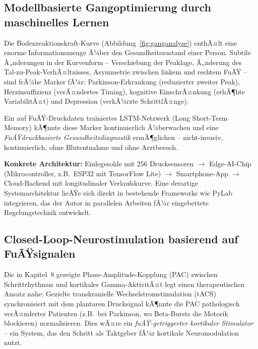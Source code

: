 ﻿\documentclass[12pt,a4paper]{report}
\theoremstyle{plain}
\theoremstyle{definition}
\theoremstyle{remark}
\begin{document}
\subsection{Modellbasierte Gangoptimierung durch maschinelles Lernen}

Die Bodenreaktionskraft-Kurve (Abbildung~\ref{fig:ganganalyse})
enthÃ¤lt eine enorme Informationsmenge Ã¼ber den Gesundheitszustand
einer Person. Subtile Ã„nderungen in der Kurvenform -- Verschiebung
der Peaklage, Ã„nderung des Tal-zu-Peak-VerhÃ¤ltnisses, Asymmetrie
zwischen linkem und rechtem FuÃŸ -- sind frÃ¼he Marker fÃ¼r:
Parkinson-Erkrankung (reduzierter zweiter Peak), Herzinsuffizienz
(verÃ¤ndertes Timing), kognitive EinschrÃ¤nkung (erhÃ¶hte VariabilitÃ¤t)
und Depression (verkÃ¼rzte SchrittlÃ¤nge).

Ein auf FuÃŸ-Druckdaten trainiertes LSTM-Netzwerk (Long Short-Term
Memory) kÃ¶nnte diese Marker kontinuierlich Ã¼berwachen und eine
\emph{FuÃŸdruckbasierte Gesundheitsdiagnostik} ermÃ¶glichen --
nicht-invasiv, kontinuierlich, ohne Blutentnahme und ohne
Arztbesuch.

\textbf{Konkrete Architektur:} Einlegesohle mit 256
Drucksensoren $\to$ Edge-AI-Chip (Mikrocontroller, z.B.\ ESP32 mit
TensorFlow Lite) $\to$ Smartphone-App $\to$ Cloud-Backend mit
longitudinaler Verlaufskurve. Eine derartige Systemarchitektur
lieÃŸe sich direkt in bestehende Frameworks wie PyLab integrieren,
das der Autor in parallelen Arbeiten fÃ¼r eingebettete
Regelungstechnik entwickelt.

\subsection{Closed-Loop-Neurostimulation basierend auf FuÃŸsignalen}

Die in Kapitel~8 gezeigte Phase-Amplitude-Kopplung (PAC) zwischen
Schrittrhythmus und kortikaler Gamma-AktivitÃ¤t legt einen
therapeutischen Ansatz nahe: Gezielte transkranielle
Wechselstromstimulation (tACS) synchronisiert mit dem plantaren
Drucksignal kÃ¶nnte die PAC pathologisch verÃ¤nderter Patienten
(z.B.\ bei Parkinson, wo Beta-Bursts die Motorik blockieren)
normalisieren. Dies wÃ¤re ein \emph{fuÃŸ-getriggerter kortikaler
Stimulator} -- ein System, das den Schritt als Taktgeber fÃ¼r
kortikale Neuromodulation nutzt.

\end{document}
